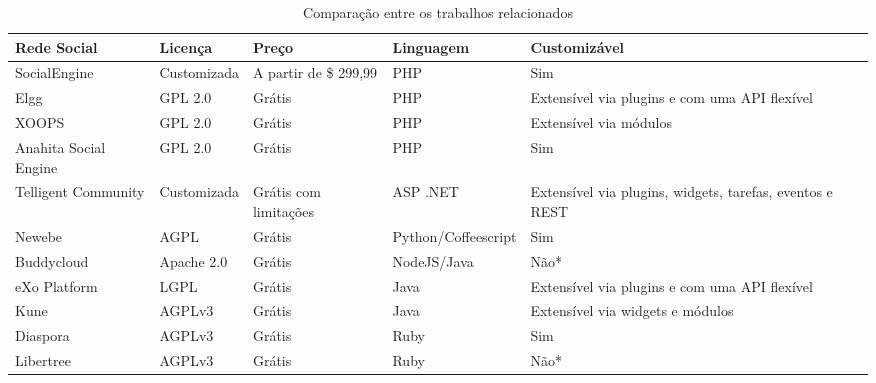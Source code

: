 \begin{table}[]
\centering
\caption{Comparação entre os trabalhos relacionados}
\label{comparacao}
\begin{adjustbox}{width=\textwidth}
\begin{tabular}{@{}llllll@{}}
\toprule
\textbf{Rede Social}  & \textbf{Licença} & \textbf{Preço}        & \textbf{Linguagem}  & \textbf{Customizável}                                    \\ \midrule
SocialEngine          & Customizada      & A partir de \$ 299,99 & PHP                 & Sim                                                      \\
Elgg                  & GPL 2.0          & Grátis                & PHP                 & Extensível via plugins e com uma API flexível            \\
XOOPS                 & GPL 2.0          & Grátis                & PHP                 & Extensível via módulos                                   \\
Anahita Social Engine & GPL 2.0          & Grátis                & PHP                 & Sim                                                      \\
Telligent Community   & Customizada      & Grátis com limitações & ASP .NET            & Extensível via plugins, widgets, tarefas, eventos e REST \\
Newebe                & AGPL             & Grátis                & Python/Coffeescript & Sim                                                      \\
Buddycloud            & Apache 2.0       & Grátis                & NodeJS/Java         & Não*                                                     \\
eXo Platform          & LGPL             & Grátis                & Java                & Extensível via plugins e com uma API flexível            \\
Kune                  & AGPLv3           & Grátis                & Java                & Extensível via widgets e módulos                         \\
Diaspora              & AGPLv3           & Grátis                & Ruby                & Sim                                                      \\
Libertree             & AGPLv3           & Grátis                & Ruby                & Não*                                                     \\ \bottomrule
\end{tabular}
\end{adjustbox}
\end{table}

